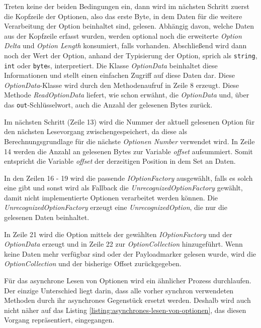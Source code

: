 Treten keine der beiden Bedingungen ein, dann wird im nächsten Schritt zuerst die Kopfzeile der Optionen, also das erste Byte, in dem Daten für die weitere Verarbeitung der Option beinhaltet sind, gelesen. Abhängig davon, welche Daten aus der Kopfzeile erfasst wurden, werden optional noch die erweiterte \textit{Option Delta} und \textit{Option Length} konsumiert, falls vorhanden. Abschließend wird dann noch der Wert der Option, anhand der Typisierung der Option, sprich als \texttt{string}, \texttt{int} oder \texttt{byte}s, interpretiert. Die Klasse \textit{OptionData} beinhaltet diese Informationen und stellt einen einfachen Zugriff auf diese Daten dar. Diese \textit{OptionData}-Klasse wird durch den Methodenaufruf in Zeile 8 erzeugt. Diese Methode \textit{ReadOptionData} liefert, wie schon erwähnt, die \textit{OptionData} und, über das \texttt{out}-Schlüsselwort, auch die Anzahl der gelesenen Bytes zurück.

Im nächsten Schritt (Zeile 13) wird die Nummer der aktuell gelesenen Option für den nächsten Lesevorgang zwischengespeichert, da diese als Berechnungsgrundlage für die nächste \textit{Optionen Number} verwendet wird. In Zeile 14 werden die Anzahl an gelesenen Bytes zur Variable \textit{offset} aufsummiert. Somit entspricht die Variable \textit{offset} der derzeitigen Position in dem Set an Daten.

In den Zeilen 16 - 19 wird die passende \textit{IOptionFactory} ausgewählt, falls es solch eine gibt und sonst wird als Fallback die \textit{UnrecognizedOptionFactory} gewählt, damit nicht implementierte Optionen verarbeitet werden können. Die \textit{UnrecognizedOptionFactory} erzeugt eine \textit{UnrecognizedOption}, die nur die gelesenen Daten beinhaltet.

In Zeile 21 wird die Option mittels der gewählten \textit{IOptionFactory} und der \textit{OptionData} erzeugt und in Zeile 22 zur \textit{OptionCollection} hinzugeführt. Wenn keine Daten mehr verfügbar sind oder der Payloadmarker gelesen wurde, wird die \textit{OptionCollection} und der bisherige Offset zurückgegeben.

Für das asynchrone Lesen von Optionen wird ein ähnlicher Prozess durchlaufen. Der einzige Unterschied liegt darin, dass alle vorher synchron verwendeten Methoden durch ihr asynchrones Gegenstück ersetzt werden. Deshalb wird auch nicht näher auf das Listing \ref{listing:asynchrones-lesen-von-optionen}, das diesen Vorgang repräsentiert, eingegangen.

